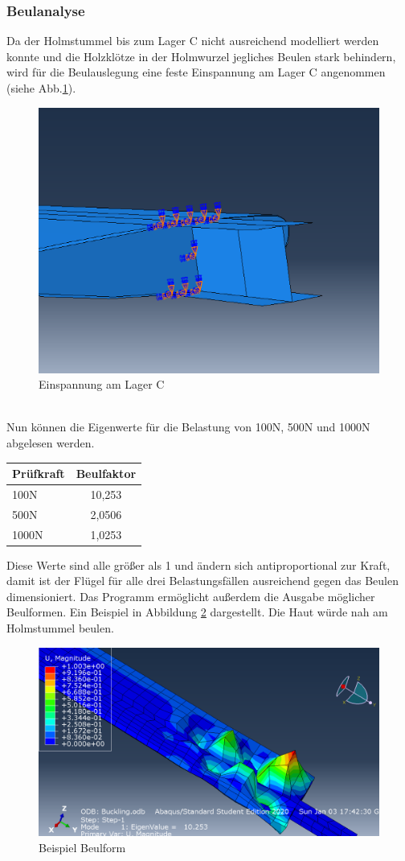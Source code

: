 \subsubsection{Beulanalyse}
Da der Holmstummel bis zum Lager C nicht ausreichend modelliert werden konnte und die Holzklötze in der Holmwurzel jegliches Beulen stark behindern, wird für die Beulauslegung eine feste Einspannung am Lager C angenommen (siehe Abb.\ref{BEinspannung}).
\begin{figure}[h]
 \centering
 \includegraphics[scale=0.4]{Bilder/Beuleinspannung}
 \caption{Einspannung am Lager C}
 \label{BEinspannung}
\end{figure}\\
\noindent
Nun können die Eigenwerte für die Belastung von 100N, 500N und 1000N abgelesen werden.
\begin{center}
\begin{tabular}[h]{l|c}
Prüfkraft&Beulfaktor\\
\hline
100N&10,253\\
500N&2,0506\\
1000N&1,0253\\
\end{tabular}
\end{center}
\noindent
Diese Werte sind alle größer als 1 und ändern sich antiproportional zur Kraft, damit ist der Flügel für alle drei Belastungsfällen ausreichend gegen das Beulen dimensioniert.
Das Programm ermöglicht außerdem die Ausgabe möglicher Beulformen. Ein Beispiel in Abbildung \ref{Beulform} dargestellt. Die Haut würde nah am Holmstummel beulen. 
\begin{figure}[h]
 \centering
 \includegraphics[scale=0.4]{Bilder/Beulen100N}
 \caption{Beispiel Beulform}
 \label{Beulform}
\end{figure}
\newpage
\newpage

 

  
